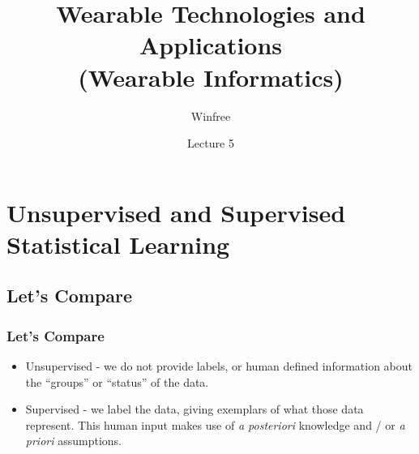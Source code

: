 \documentclass[aspectratio=169]{beamer} %
\title[INF632 (EE499/EE599)]{Wearable Technologies and Applications\\(Wearable Informatics)} %
\author{Winfree}
\date{Lecture 5}
\begin{document}
	\maketitle




\section{Unsupervised and Supervised Statistical Learning}
	\subsection{Let's Compare}
	\begin{frame}
		\frametitle{Let's Compare}
		\begin{itemize}
			\item Unsupervised - we do not provide labels, or human defined information about the ``groups'' or ``status'' of the data.
			\item Supervised - we label the data, giving exemplars of what those data represent.  This human input makes use of {\em a posteriori} knowledge and / or {\em a priori} assumptions.
		\end{itemize}


	\end{frame}
\end{document}
